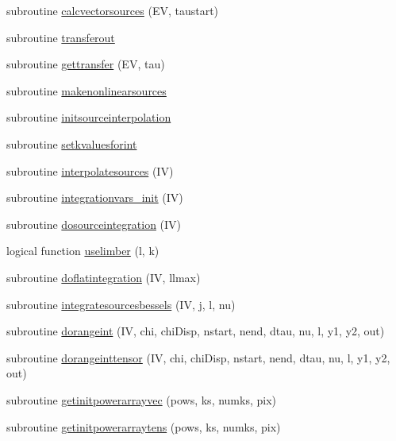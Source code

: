 \begin{DoxyCompactItemize}
subroutine \mbox{\hyperlink{namespacecambmain_affd6aea4c80363ff01132e154eabbb00}{calcvectorsources}} (EV, taustart)
\item 
subroutine \mbox{\hyperlink{namespacecambmain_a3411884ad6ba8d1584e9dedab9fdab81}{transferout}}
\item 
subroutine \mbox{\hyperlink{namespacecambmain_ac9e5e052a53e579f43f980836baee5be}{gettransfer}} (EV, tau)
\item 
subroutine \mbox{\hyperlink{namespacecambmain_a5b302c437be8bf6d127dc65f638778c8}{makenonlinearsources}}
\item 
subroutine \mbox{\hyperlink{namespacecambmain_a4af989c7e3c97477fc61f6b31dd053e7}{initsourceinterpolation}}
\item 
subroutine \mbox{\hyperlink{namespacecambmain_ad0f2dd9e839652502a6e34c32ec44e0d}{setkvaluesforint}}
\item 
subroutine \mbox{\hyperlink{namespacecambmain_a7e1e9bb292a8b4d778e9b8d218ee4036}{interpolatesources}} (IV)
\item 
subroutine \mbox{\hyperlink{namespacecambmain_af5b8d9ce147ddcd3fb33ee015b43b284}{integrationvars\+\_\+init}} (IV)
\item 
subroutine \mbox{\hyperlink{namespacecambmain_a89b9b0f69a8f18b112b2309db4ad29c6}{dosourceintegration}} (IV)
\item 
logical function \mbox{\hyperlink{namespacecambmain_ad1efd57b702656e463555cccd0f1b40c}{uselimber}} (l, k)
\item 
subroutine \mbox{\hyperlink{namespacecambmain_a66b6d740c5e702807d5454979eec8cde}{doflatintegration}} (IV, llmax)
\item 
subroutine \mbox{\hyperlink{namespacecambmain_a74b9c41eb2501d8c0cc163ff7030a926}{integratesourcesbessels}} (IV, j, l, nu)
\item 
subroutine \mbox{\hyperlink{namespacecambmain_af0980e25384f7d9b2eb64435231f3aa5}{dorangeint}} (IV, chi, chi\+Disp, nstart, nend, dtau, nu, l, y1, y2, out)
\item 
subroutine \mbox{\hyperlink{namespacecambmain_af5113df414eaba3ff8913a737da72c34}{dorangeinttensor}} (IV, chi, chi\+Disp, nstart, nend, dtau, nu, l, y1, y2, out)
\item 
subroutine \mbox{\hyperlink{namespacecambmain_a5fb4d38dca7390cd662572152b12f7d0}{getinitpowerarrayvec}} (pows, ks, numks, pix)
\item 
subroutine \mbox{\hyperlink{namespacecambmain_af4005843871d59b0973861e895fdb0d3}{getinitpowerarraytens}} (pows, ks, numks, pix)
\item 

\end{DoxyCompactItemize}
